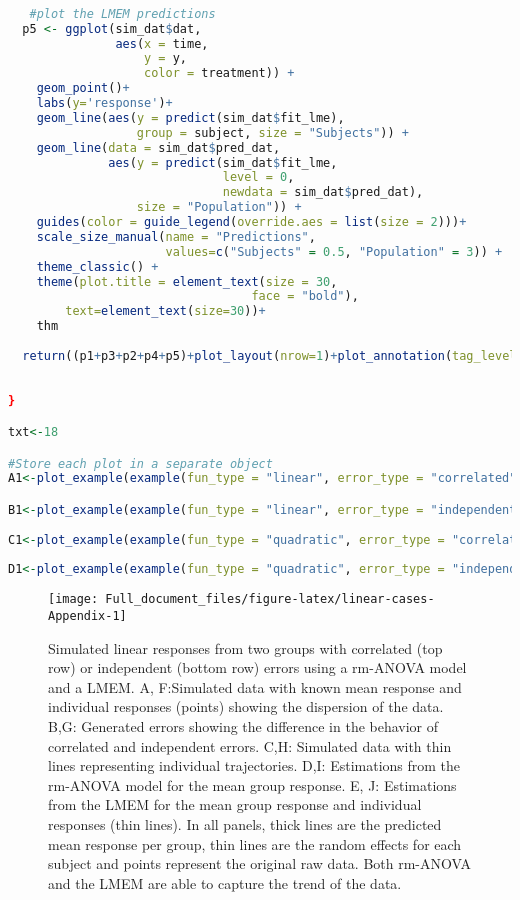 \documentclass[
]{article}
\begin{document}
\begin{lstlisting}[language=R]
   
   
   #plot the LMEM predictions
  p5 <- ggplot(sim_dat$dat, 
               aes(x = time, 
                   y = y, 
                   color = treatment)) +
    geom_point()+
    labs(y='response')+
    geom_line(aes(y = predict(sim_dat$fit_lme), 
                  group = subject, size = "Subjects")) +
    geom_line(data = sim_dat$pred_dat, 
              aes(y = predict(sim_dat$fit_lme, 
                              level = 0, 
                              newdata = sim_dat$pred_dat), 
                  size = "Population")) +
    guides(color = guide_legend(override.aes = list(size = 2)))+
    scale_size_manual(name = "Predictions", 
                      values=c("Subjects" = 0.5, "Population" = 3)) +
    theme_classic() +
    theme(plot.title = element_text(size = 30, 
                                  face = "bold"),
        text=element_text(size=30))+
    thm
  
  return((p1+p3+p2+p4+p5)+plot_layout(nrow=1)+plot_annotation(tag_levels = 'A')) 
  
    
}

txt<-18

#Store each plot in a separate object
A1<-plot_example(example(fun_type = "linear", error_type = "correlated")) 

B1<-plot_example(example(fun_type = "linear", error_type = "independent")) 
  
C1<-plot_example(example(fun_type = "quadratic", error_type = "correlated")) 
  
D1<-plot_example(example(fun_type = "quadratic", error_type = "independent")) 
\end{lstlisting}



\begin{figure}[H]
\texttt{[image: Full\_document\_files/figure-latex/linear-cases-Appendix-1]} \caption{Simulated linear responses from two groups with correlated (top row) or independent (bottom row) errors using a rm-ANOVA model and a LMEM. A, F:Simulated data with known mean response and individual responses (points) showing the dispersion of the data. B,G: Generated errors showing the difference in the behavior of correlated and independent errors. C,H: Simulated data with thin lines representing individual trajectories. D,I: Estimations from the rm-ANOVA model for the mean group response. E, J: Estimations from the LMEM for the mean group response and individual responses (thin lines). In all panels, thick lines are the predicted mean response per group, thin lines are the random effects for each subject and points represent the original raw data. Both rm-ANOVA and the LMEM are able to capture the trend of the data.}\label{fig:linear-cases-Appendix}
\end{figure}
\end{document}
